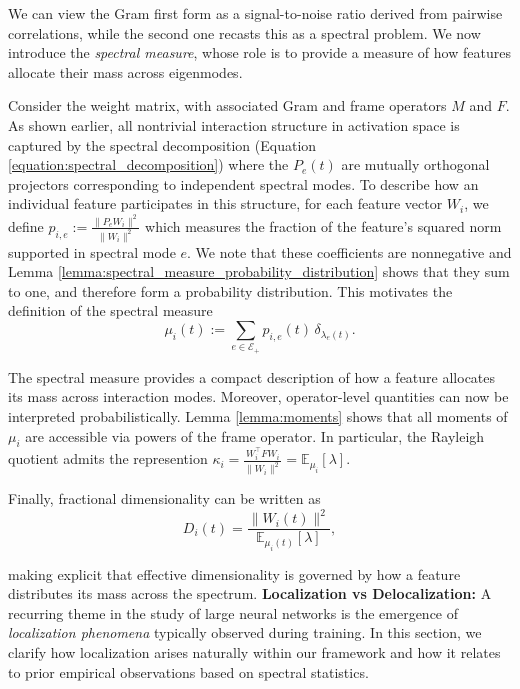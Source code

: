 \documentclass{article}
\theoremstyle{plain}
\numberwithin{equation}{section}
\theoremstyle{definition}
\theoremstyle{remark}
\begin{document}
 We can view the Gram first form as a signal-to-noise ratio derived from pairwise correlations, while the second one recasts this as a spectral problem.
We now introduce the \emph{spectral measure}, whose role is to provide a measure of how features allocate their mass across eigenmodes.

Consider the weight matrix, with associated Gram and frame operators $M$ and $F$. As shown earlier, all nontrivial interaction structure in activation space is captured by the spectral decomposition (Equation \ref{equation:spectral_decomposition}) where the $P_e(t)$ are mutually orthogonal projectors corresponding to independent spectral modes. To describe how an individual feature participates in this structure, for each feature vector $W_i$, we define $p_{i,e} := \frac{\|P_e W_i\|^2}{\|W_i\|^2}$ which measures the fraction of the feature’s squared norm supported in spectral mode $e$. We note that these coefficients are nonnegative and Lemma \ref{lemma:spectral_measure_probability_distribution} shows that they sum to one, and therefore form a probability distribution. This motivates the definition of the spectral measure
\begin{equation}
    \label{equation:probability_distribution_eigenmodes}
    \mu_i(t) := \sum_{e \in \mathcal{E}_+} p_{i,e}(t)\,\delta_{\lambda_e(t)}.
\end{equation}


The spectral measure provides a compact description of how a feature allocates its mass across interaction modes. Moreover, operator-level quantities can now be interpreted probabilistically. Lemma \ref{lemma:moments} shows that all moments of $\mu_i$ are accessible via powers of the frame operator. In particular, the Rayleigh quotient admits the represention $\kappa_i
= \frac{W_i^\top F W_i}{\|W_i\|^2}
= \mathbb{E}_{\mu_i}[\lambda].
$

Finally, fractional dimensionality can be written as
\begin{equation}
    D_i(t) = \frac{\|W_i(t)\|^2}{\mathbb{E}_{\mu_i(t)}[\lambda]},
\end{equation}

making explicit that effective dimensionality is governed by how a feature distributes its mass across the spectrum.
\iffalse
\textbf{Localization vs Delocalization: }
A recurring theme in the study of large neural networks is the emergence of \emph{localization phenomena} typically observed during training. In this section, we clarify how localization arises naturally within our framework and how it relates to prior empirical observations based on spectral statistics.
\end{document}
